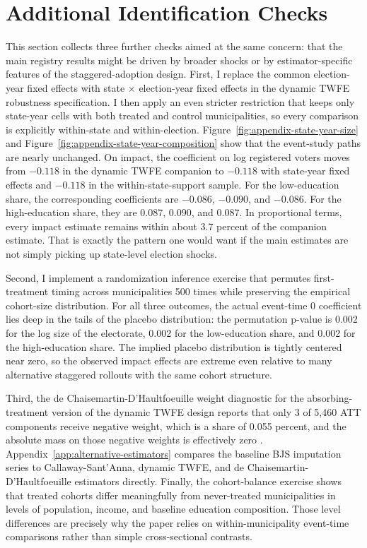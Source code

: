 \section{Additional Identification Checks}
\label{app:additional-robustness}

This section collects three further checks aimed at the same concern: that the main registry results might be driven by broader shocks or by estimator-specific features of the staggered-adoption design. First, I replace the common election-year fixed effects with state $\times$ election-year fixed effects in the dynamic TWFE robustness specification. I then apply an even stricter restriction that keeps only state-year cells with both treated and control municipalities, so every comparison is explicitly within-state and within-election. Figure~\ref{fig:appendix-state-year-size} and Figure~\ref{fig:appendix-state-year-composition} show that the event-study paths are nearly unchanged. On impact, the coefficient on log registered voters moves from $-0.118$ in the dynamic TWFE companion to $-0.118$ with state-year fixed effects and $-0.118$ in the within-state-support sample. For the low-education share, the corresponding coefficients are $-0.086$, $-0.090$, and $-0.086$. For the high-education share, they are $0.087$, $0.090$, and $0.087$. In proportional terms, every impact estimate remains within about 3.7 percent of the companion estimate. That is exactly the pattern one would want if the main estimates are not simply picking up state-level election shocks.

Second, I implement a randomization inference exercise that permutes first-treatment timing across municipalities 500 times while preserving the empirical cohort-size distribution. For all three outcomes, the actual event-time $0$ coefficient lies deep in the tails of the placebo distribution: the permutation p-value is 0.002 for the log size of the electorate, 0.002 for the low-education share, and 0.002 for the high-education share. The implied placebo distribution is tightly centered near zero, so the observed impact effects are extreme even relative to many alternative staggered rollouts with the same cohort structure.

Third, the de Chaisemartin-D'Haultfoeuille weight diagnostic for the absorbing-treatment version of the dynamic TWFE design reports that only 3 of 5{,}460 ATT components receive negative weight, which is a share of 0.055 percent, and the absolute mass on those negative weights is effectively zero \citep{deChaisemartin2020TwoWayFixed}. Appendix~\ref{app:alternative-estimators} compares the baseline BJS imputation series to Callaway-Sant'Anna, dynamic TWFE, and de Chaisemartin-D'Haultfoeuille estimators directly. Finally, the cohort-balance exercise shows that treated cohorts differ meaningfully from never-treated municipalities in levels of population, income, and baseline education composition. Those level differences are precisely why the paper relies on within-municipality event-time comparisons rather than simple cross-sectional contrasts.

